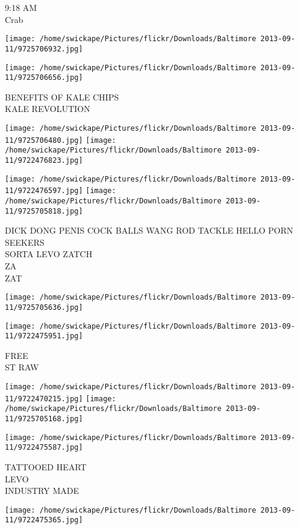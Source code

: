 \documentclass[10pt,letterpaper]{article}
\begin{document}
9:18 AM\\
Crab
\pagebreak

\texttt{[image: /home/swickape/Pictures/flickr/Downloads/Baltimore 2013-09-11/9725706932.jpg]}

\vspace{0.25in}
\texttt{[image: /home/swickape/Pictures/flickr/Downloads/Baltimore 2013-09-11/9725706656.jpg]}

BENEFITS OF KALE CHIPS\\
KALE REVOLUTION
\pagebreak

\texttt{[image: /home/swickape/Pictures/flickr/Downloads/Baltimore 2013-09-11/9725706480.jpg]}
\texttt{[image: /home/swickape/Pictures/flickr/Downloads/Baltimore 2013-09-11/9722476823.jpg]}

\texttt{[image: /home/swickape/Pictures/flickr/Downloads/Baltimore 2013-09-11/9722476597.jpg]}
\texttt{[image: /home/swickape/Pictures/flickr/Downloads/Baltimore 2013-09-11/9725705818.jpg]}

DICK DONG PENIS COCK BALLS WANG ROD TACKLE HELLO PORN SEEKERS\\
SORTA LEVO ZATCH\\
ZA\\
ZAT
\pagebreak

\texttt{[image: /home/swickape/Pictures/flickr/Downloads/Baltimore 2013-09-11/9725705636.jpg]}

\vspace{0.25in}
\texttt{[image: /home/swickape/Pictures/flickr/Downloads/Baltimore 2013-09-11/9722475951.jpg]}

FREE\\
ST RAW
\pagebreak

\texttt{[image: /home/swickape/Pictures/flickr/Downloads/Baltimore 2013-09-11/9722470215.jpg]}
\texttt{[image: /home/swickape/Pictures/flickr/Downloads/Baltimore 2013-09-11/9725705168.jpg]}

\texttt{[image: /home/swickape/Pictures/flickr/Downloads/Baltimore 2013-09-11/9722475587.jpg]}

TATTOOED HEART\\
LEVO\\
INDUSTRY MADE
\pagebreak

\texttt{[image: /home/swickape/Pictures/flickr/Downloads/Baltimore 2013-09-11/9722475365.jpg]}
\end{document}
